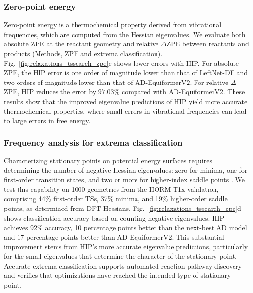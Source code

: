 \documentclass[pdflatex,sn-mathphys-num]{sn-jnl}%
\begin{document}
\subsubsection{Zero-point energy}
Zero-point energy is a thermochemical property derived from vibrational frequencies, which are computed from the Hessian eigenvalues. We evaluate both absolute ZPE at the reactant geometry and relative $\Delta$ZPE between reactants and products (Methods, ZPE and extrema classification).
Fig.~\ref{fig:relaxations_tssearch_zpe}c shows lower errors with HIP. For absolute ZPE, the HIP error is one order of magnitude lower than that of LeftNet-DF and two orders of magnitude lower than that of AD-EquiformerV2. For relative $\Delta$ZPE, HIP reduces the error by $97.03\%$ compared with AD-EquiformerV2.
These results show that the improved eigenvalue predictions of HIP yield more accurate thermochemical properties, where small errors in vibrational frequencies can lead to large errors in free energy.



\subsubsection{Frequency analysis for extrema classification}
Characterizing stationary points on potential energy surfaces requires determining the number of negative Hessian eigenvalues: zero for minima, one for first-order transition states, and two or more for higher-index saddle points \cite{maronsson2012method}. We test this capability on 1000 geometries from the HORM-T1x validation, comprising 44\% first-order TSs, 37\% minima, and 19\% higher-order saddle points, as determined from DFT Hessians.
Fig.~\ref{fig:relaxations_tssearch_zpe}d shows classification accuracy based on counting negative eigenvalues. HIP achieves 92\% accuracy, 10 percentage points better than the next-best AD model and 17 percentage points better than AD-EquiformerV2. This substantial improvement stems from HIP's more accurate eigenvalue predictions, particularly for the small eigenvalues that determine the character of the stationary point.
Accurate extrema classification supports automated reaction-pathway discovery and verifies that optimizations have reached the intended type of stationary point.
\end{document}
